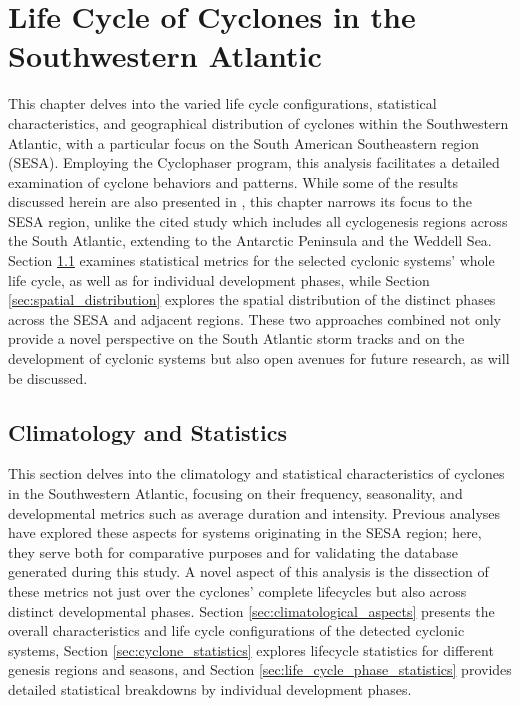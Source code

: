 \chapter{Life Cycle of Cyclones in the Southwestern Atlantic}\label{ch:life_cycle}

This chapter delves into the varied life cycle configurations, statistical characteristics, and geographical distribution of cyclones within the Southwestern Atlantic, with a particular focus on the South American Southeastern region (SESA). Employing the Cyclophaser program, this analysis facilitates a detailed examination of cyclone behaviors and patterns. While some of the results discussed herein are also presented in \citep{deSouza2024}, this chapter narrows its focus to the SESA region, unlike the cited study which includes all cyclogenesis regions across the South Atlantic, extending to the Antarctic Peninsula and the Weddell Sea. Section \ref{sec:climatology_statistics} examines statistical metrics for the selected cyclonic systems' whole life cycle, as well as for individual development phases, while Section \ref{sec:spatial_distribution} explores the spatial distribution of the distinct phases across the SESA and adjacent regions. These two approaches combined not only provide a novel perspective on the South Atlantic storm tracks and on the development of cyclonic systems but also open avenues for future research, as will be discussed.

\section{Climatology and Statistics}
\label{sec:climatology_statistics}

This section delves into the climatology and statistical characteristics of cyclones in the Southwestern Atlantic, focusing on their frequency, seasonality, and developmental metrics such as average duration and intensity. Previous analyses have explored these aspects for systems originating in the SESA region; here, they serve both for comparative purposes and for validating the database generated during this study. A novel aspect of this analysis is the dissection of these metrics not just over the cyclones’ complete lifecycles but also across distinct developmental phases. Section \ref{sec:climatological_aspects} presents the overall characteristics and life cycle configurations of the detected cyclonic systems, Section \ref{sec:cyclone_statistics} explores lifecycle statistics for different genesis regions and seasons, and Section \ref{sec:life_cycle_phase_statistics} provides detailed statistical breakdowns by individual development phases.


